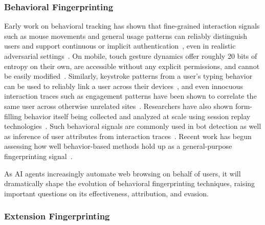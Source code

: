 \subsubsection{Behavioral Fingerprinting} 
\label{sec:stateless-techniques-behavioral-fingperinting}

Early work on behavioral tracking has shown that fine-grained interaction signals such as mouse movements and general usage patterns can reliably distinguish users and support continuous or implicit authentication~\cite{attererKnowingUsersEvery2006,zhengEfficientUserVerification2011,jorgensenMouseDynamicsBehavioral2011}, even in realistic adversarial settings~\cite{fereidooniAuthentiSenseScalableBehavioral2023}.
%
On mobile, touch gesture dynamics offer roughly 20 bits of entropy on their own, are accessible without any explicit permissions, and cannot be easily modified~\cite{masoodTouchYoureTrappcked2018}.
%
Similarly, keystroke patterns from a user's typing behavior can be used to reliably link a user across their devices~\cite{yuanCrossdeviceTrackingIdentification2018}, and even innocuous interaction traces such as engagement patterns have been shown to correlate the same user across otherwise unrelated sites~\cite{gogaExploitingInnocuousActivity2013}.
%
Researchers have also shown form-filling behavior itself being collected and analyzed at scale using session replay technologies~\cite{linFillBlanksEmpirical2020,cuiUnderstandingPrivacyNorms2025,acarNoBoundariesData2020}. 
%
Such behavioral signals are commonly used in bot detection as well as inference of user attributes from interaction traces~\cite{leivaMyMouseMy2021}.
%
Recent work has begun assessing how well behavior-based methods hold up as a general-purpose fingerprinting signal~\cite{crichtonRethinkingFingerprintingAssessment2025}.

\begin{opbox}
As AI agents increasingly automate web browsing on behalf of users, it will dramatically shape the evolution of behavioral fingerprinting techniques, raising important questions on its effectiveness, attribution, and evasion.
\end{opbox}


\subsubsection{Extension Fingerprinting} 
\label{sec:stateless-techniques-extension-fingperinting}

